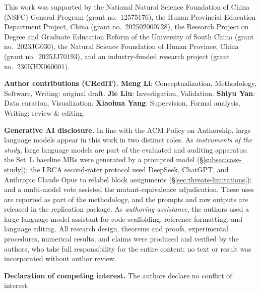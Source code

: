 \documentclass[manuscript]{acmart}
\begin{document}
\begin{acks}
This work was supported by the National Natural Science Foundation of China (NSFC) General Program (grant no.\ 12575176), the Hunan Provincial Education Department Project, China (grant no.\ 202502000728), the Research Project on Degree and Graduate Education Reform of the University of South China (grant no.\ 2023JG030), the Natural Science Foundation of Hunan Province, China (grant no.\ 2025JJ70193), and an industry-funded research project (grant no.\ 230KHX060001).

\smallskip
\noindent\textbf{Author contributions (CRediT).}
\textbf{Meng Li}: Conceptualization, Methodology, Software, Writing: original draft.
\textbf{Jie Liu}: Investigation, Validation.
\textbf{Shiyu Yan}: Data curation, Visualization.
\textbf{Xiaohua Yang}: Supervision, Formal analysis, Writing: review \& editing.

\smallskip
\noindent\textbf{Generative AI disclosure.}
In line with the ACM Policy on Authorship, large language models appear in this work in two distinct roles. As \emph{instruments of the study}, large language models are part of the evaluated and auditing apparatus: the Set~L baseline MRs were generated by a prompted model (\S\ref{subsec:case-study}); the LRCA second-rater protocol used DeepSeek, ChatGPT, and Anthropic Claude Opus to relabel block assignments (\S\ref{sec:threats-limitations}); and a multi-model vote assisted the mutant-equivalence adjudication. These uses are reported as part of the methodology, and the prompts and raw outputs are released in the replication package. As \emph{authoring assistance}, the authors used a large-language-model assistant for code scaffolding, reference formatting, and language editing. All research design, theorems and proofs, experimental procedures, numerical results, and claims were produced and verified by the authors, who take full responsibility for the entire content; no text or result was incorporated without author review.

\smallskip
\noindent\textbf{Declaration of competing interest.}
The authors declare no conflict of interest.
\end{acks}



\end{document}
